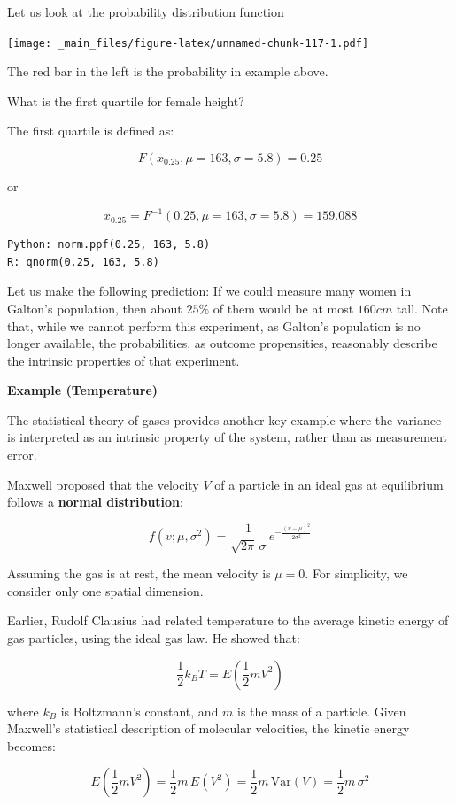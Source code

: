 \documentclass[
]{book}
\begin{document}
Let us look at the probability distribution function

\texttt{[image: \_main\_files/figure-latex/unnamed-chunk-117-1.pdf]}

The red bar in the left is the probability in example above.

What is the first quartile for female height?

The first quartile is defined as:

\[F(x_{0.25}, \mu=163, \sigma=5.8)=0.25\]

or

\[x_{0.25}=F^{-1}(0.25, \mu=163, \sigma=5.8)=159.088\]

\begin{verbatim}
Python: norm.ppf(0.25, 163, 5.8)
R: qnorm(0.25, 163, 5.8)
\end{verbatim}

Let us make the following prediction: If we could measure many women in Galton's population, then about \(25\%\) of them would be at most \(160cm\) tall. Note that, while we cannot perform this experiment, as Galton's population is no longer available, the probabilities, as outcome propensities, reasonably describe the intrinsic properties of that experiment.

\textbf{Example (Temperature)}

The statistical theory of gases provides another key example where the variance is interpreted as an intrinsic property of the system, rather than as measurement error.

Maxwell proposed that the velocity \(V\) of a particle in an ideal gas at equilibrium follows a \textbf{normal distribution}:

\[
f(v; \mu, \sigma^2) = \frac{1}{\sqrt{2\pi} \, \sigma} \, e^{- \frac{(v - \mu)^2}{2\sigma^2}}
\]

Assuming the gas is at rest, the mean velocity is \(\mu = 0\). For simplicity, we consider only one spatial dimension.

Earlier, Rudolf Clausius had related temperature to the average kinetic energy of gas particles, using the ideal gas law. He showed that:

\[
\frac{1}{2} k_B T = E\left(\frac{1}{2} m V^2\right)
\]

where \(k_B\) is Boltzmann's constant, and \(m\) is the mass of a particle. Given Maxwell's statistical description of molecular velocities, the kinetic energy becomes:

\[
E\left(\frac{1}{2} m V^2\right) = \frac{1}{2} m \, E(V^2) = \frac{1}{2} m \, \text{Var}(V) = \frac{1}{2} m \, \sigma^2
\]
\end{document}
